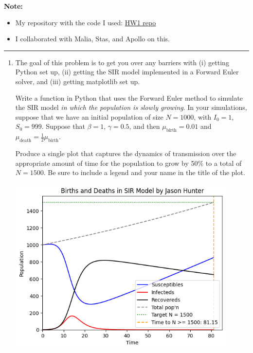 \documentclass[11pt]{article}
\begin{document}
\renewcommand{\headrulewidth}{0.4pt}

{\bf Note:} 
\begin{itemize}[itemsep=-7pt]
    \item My repository with the code I used: \href{https://github.com/JasonHunter95/infectious-diseases/tree/main/HW1}{HW1 repo}
	\item I collaborated with Malia, Stas, and Apollo on this.
\end{itemize}
\vspace{0.1in}\hrule

\begin{enumerate}

\item The goal of this problem is to get you over any barriers with 
	  (i) getting Python set up, 
	  (ii) getting the SIR model implemented in a Forward Euler solver, and
	  (iii) getting matplotlib set up.

Write a function in Python that uses the Forward Euler method to simulate the SIR model {\it
in which the population is slowly growing}.
In your simulations, suppose that we have an initial population of size $N=1000$, with $I_0=1$, $S_0=999$.
Suppose that
$\beta=1$, $\gamma=0.5$,
and then
$\mu_{\text{birth}}=0.01$
and
$\mu_{\text{death}} = \tfrac{1}{2} \mu_\text{birth}$.


Produce a single plot that captures the dynamics of transmission over the appropriate amount of time
for the population to grow by 50\% to a total of $N=1500$.
Be sure to include a legend and your name in the title of the plot.

\begin{center}
  \includegraphics[width=0.9\textwidth, height=0.6\textheight, keepaspectratio]{births-and-deaths.png}
\end{center}


\end{enumerate}
\end{document}
